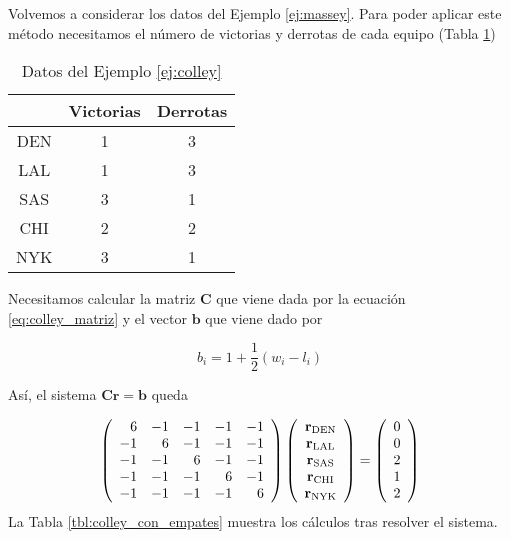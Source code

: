\begin{ejemplo} \label{ej:colley}
Volvemos a considerar los datos del Ejemplo \ref{ej:massey}. Para poder aplicar este método necesitamos el número de victorias y derrotas de cada equipo (Tabla \ref{tbl:colley})

\begin{table}[h]
\centering
\caption{Datos del Ejemplo \ref{ej:colley}}
\label{tbl:colley}
\begin{tabular}{@{}ccc@{}}
\cmidrule(l){2-3}
    & Victorias & Derrotas \\ \midrule
DEN & 1         & 3        \\
LAL & 1         & 3        \\
SAS & 3         & 1        \\
CHI & 2         & 2        \\
NYK & 3         & 1        \\ \bottomrule
\end{tabular}
\end{table}

Necesitamos calcular la matriz $\mathbf{C}$ que viene dada por la ecuación \ref{eq:colley_matriz} y el vector $\mathbf{b}$ que viene dado por

\begin{equation*}
b_i = 1 + \dfrac{1}{2}\left(w_i - l_i\right)
\end{equation*}

Así, el sistema $\mathbf{C r} = \mathbf{b}$ queda

\begin{equation*}
\left(\begin{array}{r r r r r}
 6 & -1 & -1 & -1 & -1\\
-1 &  6 & -1 & -1 & -1\\
-1 & -1 &  6 & -1 & -1\\
-1 & -1 & -1 &  6 & -1\\
-1 & -1 & -1 & -1 &  6
\end{array}\right)
\left(\begin{array}{c}
\mathbf{r}_{\text{DEN}}\\
\mathbf{r}_{\text{LAL}}\\
\mathbf{r}_{\text{SAS}}\\
\mathbf{r}_{\text{CHI}}\\
\mathbf{r}_{\text{NYK}}
\end{array}\right)
=
\left(\begin{array}{c}
0\\
0\\
2\\
1\\
2
\end{array}\right)
\end{equation*}
La Tabla \ref{tbl:colley_con_empates} muestra los cálculos tras resolver el sistema.\\


\end{ejemplo}

